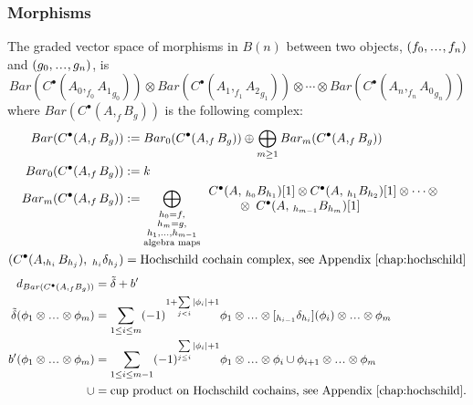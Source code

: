 \subsubsection{Morphisms}
The graded vector space of morphisms in 
$B(n)$ between two objects, 
$(f_0, \smdots, f_n)$ and 
$(g_0, \smdots, g_n)$, is 
%
\begin{equation*}
Bar(C^\bullet(A_0, _{f_0}{A_1}_{g_0})) \otimes Bar(C^\bullet(A_1, _{f_1}{A_2}_{g_1})) \otimes \cdots
\otimes Bar(C^\bullet(A_n, _{f_n}{A_0}_{g_n}))
\end{equation*}
%
where $Bar(C^\bullet(A, _fB_g))$ is 
the following complex: 
%
\begin{align*}
Bar(C^\bullet(A, _fB_g)) 
&:= Bar_0(C^\bullet(A, _fB_g)) \oplus 
  \bigoplus_{\substack{m \geq 1}} 
    Bar_m(C^\bullet(A, _fB_g)) \\
Bar_0(C^\bullet(A, _fB_g))    
&:= k\\ 
Bar_m(C^\bullet(A, _fB_g))
&:= 
  \bigoplus \limits_{\substack{
  h_0 = f, \\
  h_m = g, \\
  h_1, \dots, h_{m-1}\\ 
	\textrm{algebra maps}}} 
  \begin{array}{l}
  C^\bullet(A, \, _{h_0}B_{h_1})[1] \otimes 
  C^\bullet(A, \, _{h_1}B_{h_2})[1] 
  \otimes \dots \otimes \\
  \phantom{{}move{}} \otimes\;
  C^\bullet(A, \, _{h_{m-1}}B_{h_m})[1]
  \end{array}\\
(C^\bullet(A, _{h_i}B_{h_j}), \;
  _{h_i}\delta_{h_j})
&=
\textrm{Hochschild cochain complex, 
see Appendix \ref{chap:hochschild}}
\end{align*}
\begin{align*}
d_{Bar(C^\bullet(A, _fB_g))} 
&= 
\tilde{\delta} + b^\prime\\
\tilde{\delta}(\phi_1 \otimes \smdots \otimes \phi_m)
&=
\sum \limits_{1 \leq i \leq m}
  (-1)^{1+ \sum \limits_{j<i} |\phi_i|+1}
  \phi_1 \otimes \smdots \otimes 
  [_{h_{i-1}}\delta_{h_i}](\phi_i)
  \otimes \smdots \otimes \phi_m\\
b^\prime(\phi_1 \otimes \smdots \otimes \phi_m)
&=
\sum \limits_{1 \leq i \leq m-1}
  (-1)^{\sum \limits_{j\leq i} |\phi_i|+1}
  \phi_1 \otimes \smdots \otimes 
  \phi_i \cup \phi_{i+1}
  \otimes \smdots \otimes \phi_m\\  
\cup
&= 
\textrm{cup product on Hochschild cochains, 
see Appendix \ref{chap:hochschild}.}  
\end{align*}
